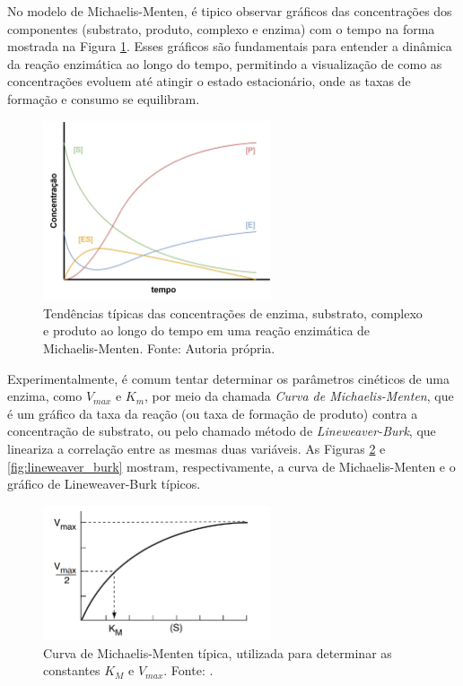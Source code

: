 \documentclass[12pt,oneside]{report}
\begin{document}
No modelo de Michaelis-Menten, é tipico observar gráficos das concentrações dos componentes (substrato, produto, complexo e enzima) com o tempo na forma mostrada na Figura \ref{fig:concentracoes_michaelis_menten}. Esses gráficos são fundamentais para entender a dinâmica da reação enzimática ao longo do tempo, permitindo a visualização de como as concentrações evoluem até atingir o estado estacionário, onde as taxas de formação e consumo se equilibram.

\begin{figure}[H]
    \centering
    \includegraphics[width=0.6\textwidth]{img/conc_time.png}
    \caption{\small Tendências típicas das concentrações de enzima, substrato, complexo e produto ao longo do tempo em uma reação enzimática de Michaelis-Menten. Fonte: Autoria própria.}
    \label{fig:concentracoes_michaelis_menten}
\end{figure}

Experimentalmente, é comum tentar determinar os parâmetros cinéticos de uma enzima, como $V_{max}$ e $K_m$, por meio da chamada \textit{Curva de Michaelis-Menten}, que é um gráfico da taxa da reação (ou taxa de formação de produto) contra a concentração de substrato, ou pelo chamado método de \textit{Lineweaver-Burk}, que lineariza a correlação entre as mesmas duas variáveis. As Figuras \ref{fig:MM_plot} e \ref{fig:lineweaver_burk} mostram, respectivamente, a curva de Michaelis-Menten e o gráfico de Lineweaver-Burk típicos.

\begin{figure}[H]
    \centering
    \includegraphics[width=0.6\textwidth]{img/Vmax_Km.png}
    \caption{\small Curva de Michaelis-Menten típica, utilizada para determinar as constantes $K_M$ e $V_{max}$. Fonte: \cite{FOGLER_2016}.}
    \label{fig:MM_plot}
\end{figure}
\end{document}
